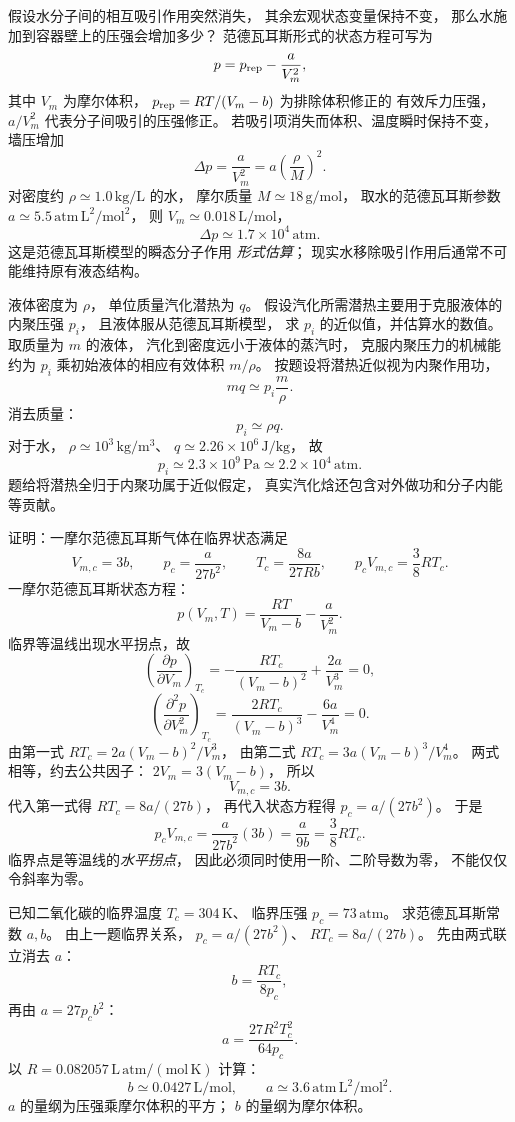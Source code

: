 假设水分子间的相互吸引作用突然消失，
其余宏观状态变量保持不变，
那么水施加到容器壁上的压强会增加多少？
\exsolution
范德瓦耳斯形式的状态方程可写为
\[
p=p_{\rm rep}-\frac{a}{V_m^2},
\]
其中 $V_m$ 为摩尔体积，
$p_{\rm rep}=RT/(V_m-b)$ 为排除体积修正的
有效斥力压强，
$a/V_m^2$ 代表分子间吸引的压强修正。
若吸引项消失而体积、温度瞬时保持不变，
墙压增加
\[
\boxed{\Delta p=\frac a{V_m^2}
=a\left(\frac{\rho}{M}\right)^2}.
\]
对密度约
$\rho\simeq1.0\,\mathrm{kg/L}$ 的水，
摩尔质量 $M\simeq18\,\mathrm{g/mol}$，
取水的范德瓦耳斯参数
$a\simeq5.5\,\mathrm{atm\,L^2/mol^2}$，
则
$V_m\simeq0.018\,\mathrm{L/mol}$，
\[
\boxed{\Delta p\simeq1.7\times10^4\,\mathrm{atm}}.
\]
\excheck 这是范德瓦耳斯模型的瞬态分子作用
\emph{形式估算}；
现实水移除吸引作用后通常不可能维持原有液态结构。

液体密度为 $\rho$，
单位质量汽化潜热为 $q$。
假设汽化所需潜热主要用于克服液体的
内聚压强 $p_i$，
且液体服从范德瓦耳斯模型，
求 $p_i$ 的近似值，并估算水的数值。
\exsolution
取质量为 $m$ 的液体，
汽化到密度远小于液体的蒸汽时，
克服内聚压力的机械能约为
$p_i$ 乘初始液体的相应有效体积
$m/\rho$。
按题设将潜热近似视为内聚作用功，
\[
mq\simeq p_i\frac m\rho.
\]
消去质量：
\[
\boxed{p_i\simeq\rho q}.
\]
对于水，
$\rho\simeq10^3\,\mathrm{kg/m^3}$、
$q\simeq2.26\times10^6\,\mathrm{J/kg}$，
故
\[
\boxed{p_i\simeq2.3\times10^9\,\mathrm{Pa}
\simeq2.2\times10^4\,\mathrm{atm}}.
\]
\excheck 题给将潜热全归于内聚功属于近似假定，
真实汽化焓还包含对外做功和分子内能等贡献。

证明：一摩尔范德瓦耳斯气体在临界状态满足
\[
V_{m,c}=3b,\qquad
p_c=\frac{a}{27b^2},\qquad
T_c=\frac{8a}{27Rb},
\qquad
p_cV_{m,c}=\frac38RT_c.
\]
\exsolution
一摩尔范德瓦耳斯状态方程：
\[
p(V_m,T)=\frac{RT}{V_m-b}-\frac{a}{V_m^2}.
\]
临界等温线出现水平拐点，故
\[
\left(\frac{\partial p}{\partial V_m}\right)_{T_c}
=-\frac{RT_c}{(V_m-b)^2}+\frac{2a}{V_m^3}=0,
\]
\[
\left(\frac{\partial^2p}{\partial V_m^2}\right)_{T_c}
=\frac{2RT_c}{(V_m-b)^3}-\frac{6a}{V_m^4}=0.
\]
由第一式
$RT_c=2a(V_m-b)^2/V_m^3$，
由第二式
$RT_c=3a(V_m-b)^3/V_m^4$。
两式相等，约去公共因子：
$2V_m=3(V_m-b)$，
所以
\[
\boxed{V_{m,c}=3b}.
\]
代入第一式得
$RT_c=8a/(27b)$，
再代入状态方程得
$p_c=a/(27b^2)$。
于是
\[
\boxed{p_cV_{m,c}
=\frac a{27b^2}(3b)
=\frac a{9b}
=\frac38RT_c}.
\]
\excheck 临界点是等温线的\emph{水平拐点}，
因此必须同时使用一阶、二阶导数为零，
不能仅仅令斜率为零。

已知二氧化碳的临界温度
$T_c=304\,\mathrm K$、
临界压强 $p_c=73\,\mathrm{atm}$。
求范德瓦耳斯常数 $a,b$。
\exsolution
由上一题临界关系，
$p_c=a/(27b^2)$、
$RT_c=8a/(27b)$。
先由两式联立消去 $a$：
\[
\boxed{b=\frac{RT_c}{8p_c}},
\]
再由 $a=27p_cb^2$：
\[
\boxed{a=\frac{27R^2T_c^2}{64p_c}}.
\]
以
$R=0.082057\,\mathrm{L\,atm/(mol\,K)}$
计算：
\[
\boxed{b\simeq0.0427\,\mathrm{L/mol}},
\qquad
\boxed{a\simeq3.6\,\mathrm{atm\,L^2/mol^2}}.
\]
\excheck $a$ 的量纲为压强乘摩尔体积的平方；
$b$ 的量纲为摩尔体积。

